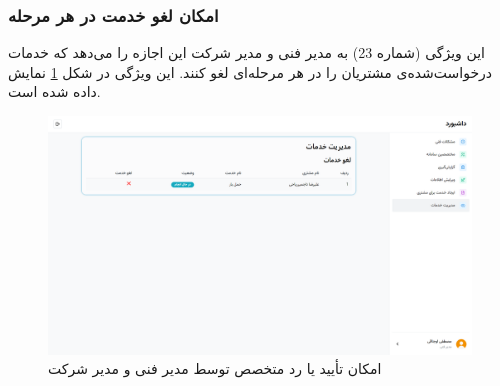 \subsubsection{امکان لغو خدمت در هر مرحله}
این ویژگی (شماره 23) به مدیر فنی و مدیر شرکت این اجازه را می‌دهد که خدمات درخواست‌شده‌ی مشتریان را در هر مرحله‌ای لغو کنند. این ویژگی در شکل
\ref{cancel-service}
نمایش داده شده است.

\begin{figure}[h]
	\centering
	\includegraphics[width=\textwidth]{figs/initial-ui/cancel-service}
	\caption{امکان تأیید یا رد متخصص توسط مدیر فنی و مدیر شرکت}
	\label{cancel-service}
\end{figure}









